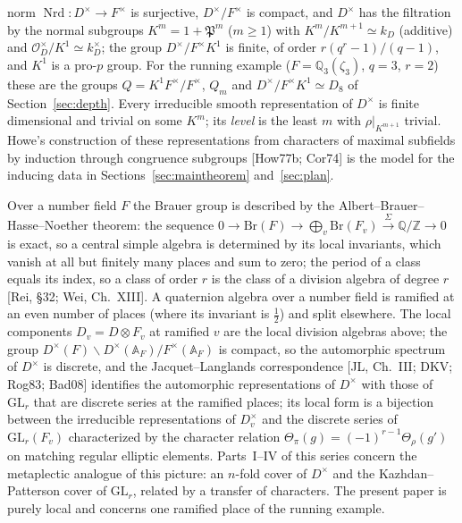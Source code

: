\documentclass[11pt]{article}
\newcommand{\Z}{\mathbb Z}
\newcommand{\Q}{\mathbb Q}
\newcommand{\Nrd}{\operatorname{Nrd}}
\newcommand{\Ocal}{\mathcal O}
\newcommand{\Pfr}{\mathfrak P}
\theoremstyle{plain}
\theoremstyle{definition}
\begin{document}
norm $\Nrd:D^\times\to F^\times$ is surjective, $D^\times/F^\times$ is
compact, and $D^\times$ has the filtration by the normal subgroups
$K^m=1+\Pfr^m$ ($m\ge1$) with $K^m/K^{m+1}\simeq k_D$ (additive) and
$\Ocal_D^\times/K^1\simeq k_D^\times$; the group $D^\times/F^\times K^1$
is finite, of order $r(q^r-1)/(q-1)$, and $K^1$ is a pro-$p$ group.  For
the running example ($F=\Q_3(\zeta_3)$, $q=3$, $r=2$) these are the
groups $Q=K^1F^\times/F^\times$, $Q_m$ and $D^\times/F^\times K^1\simeq D_8$
of Section~\ref{sec:depth}.  Every irreducible smooth representation of
$D^\times$ is finite dimensional and trivial on some $K^m$; its
\emph{level} is the least $m$ with $\rho|_{K^{m+1}}$ trivial.  Howe's
construction of these representations from characters of maximal
subfields by induction through congruence subgroups [How77b; Cor74] is
the model for the inducing data in Sections~\ref{sec:maintheorem}
and~\ref{sec:plan}.

Over a number field $F$ the Brauer group is described by the
Albert--Brauer--Hasse--Noether theorem: the sequence
$0\to\mathrm{Br}(F)\to\bigoplus_v\mathrm{Br}(F_v)\xrightarrow{\ \Sigma\ }\Q/\Z\to0$
is exact, so a central simple algebra is determined by its local
invariants, which vanish at all but finitely many places and sum to
zero; the period of a class equals its index, so a class of order $r$ is
the class of a division algebra of degree $r$ [Rei, \S32; Wei, Ch.~XIII].
A quaternion algebra over a number field is ramified at an even number
of places (where its invariant is $\tfrac12$) and split elsewhere.  The
local components $D_v=D\otimes F_v$ at ramified $v$ are the local
division algebras above; the group $D^\times(F)\backslash D^\times(\mathbb A_F)/F^\times(\mathbb A_F)$
is compact, so the automorphic spectrum of $D^\times$ is discrete, and
the Jacquet--Langlands correspondence [JL, Ch.~III; DKV; Rog83; Bad08]
identifies the automorphic representations of $D^\times$ with those of
$\mathrm{GL}_r$ that are discrete series at the ramified places; its
local form is a bijection between the irreducible representations of
$D_v^\times$ and the discrete series of $\mathrm{GL}_r(F_v)$ characterized
by the character relation $\Theta_\pi(g)=(-1)^{r-1}\Theta_\rho(g')$ on
matching regular elliptic elements.  Parts~I--IV of this series concern
the metaplectic analogue of this picture: an $n$-fold cover of
$D^\times$ and the Kazhdan--Patterson cover of $\mathrm{GL}_r$, related
by a transfer of characters.  The present paper is purely local and
concerns one ramified place of the running example.
\end{document}
